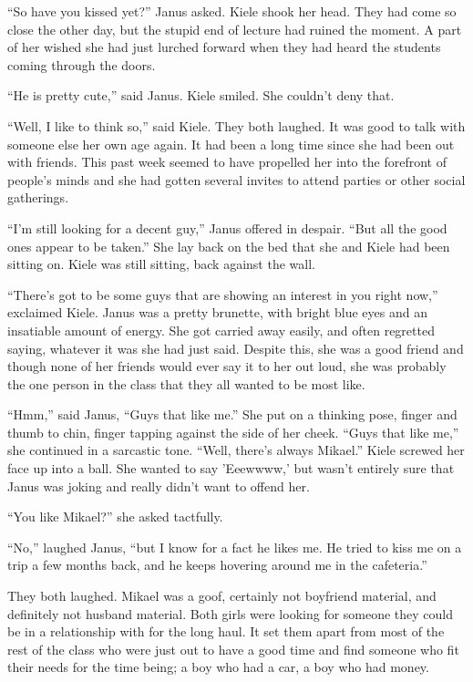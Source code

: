 ``So have you kissed yet?'' Janus asked.  Kiele shook her head.  They had come so close the other day, but the stupid end of lecture had ruined the moment.  A part of her wished she had just lurched forward when they had heard the students coming through the doors.  

``He is pretty cute,'' said Janus.  Kiele smiled.  She couldn't deny that.  

``Well, I like to think so,'' said Kiele.  They both laughed.  It was good to talk with someone else her own age again.  It had been a long time since she had been out with friends.  This past week seemed to have propelled her into the forefront of people's minds and she had gotten several invites to attend parties or other social gatherings.

``I'm still looking for a decent guy,'' Janus offered in despair.  ``But all the good ones appear to be taken.''  She lay back on the bed that she and Kiele had been sitting on.  Kiele was still sitting, back against the wall.

``There's got to be some guys that are showing an interest in you right now,'' exclaimed Kiele.  Janus was a pretty brunette, with bright blue eyes and an insatiable amount of energy.  She got carried away easily, and often regretted saying, whatever it was she had just said.  Despite this, she was a good friend and though none of her friends would ever say it to her out loud, she was probably the one person in the class that they all wanted to be most like.

``Hmm,'' said Janus, ``Guys that like me.''  She put on a thinking pose, finger and thumb to chin, finger tapping against the side of her cheek.  ``Guys that like me,'' she continued in a sarcastic tone.  ``Well, there's always Mikael.''  Kiele screwed her face up into a ball.  She wanted to say 'Eeewwww,' but wasn't entirely sure that Janus was joking and really didn't want to offend her.

``You like Mikael?'' she asked tactfully.

``No,'' laughed Janus, ``but I know for a fact he likes me.  He tried to kiss me on a trip a few months back, and he keeps hovering around me in the cafeteria.''

They both laughed.  Mikael was a goof, certainly not boyfriend material, and definitely not husband material.  Both girls were looking for someone they could be in a relationship with for the long haul.  It set them apart from most of the rest of the class who were just out to have a good time and find someone who fit their needs for the time being; a boy who had a car, a boy who had money.

